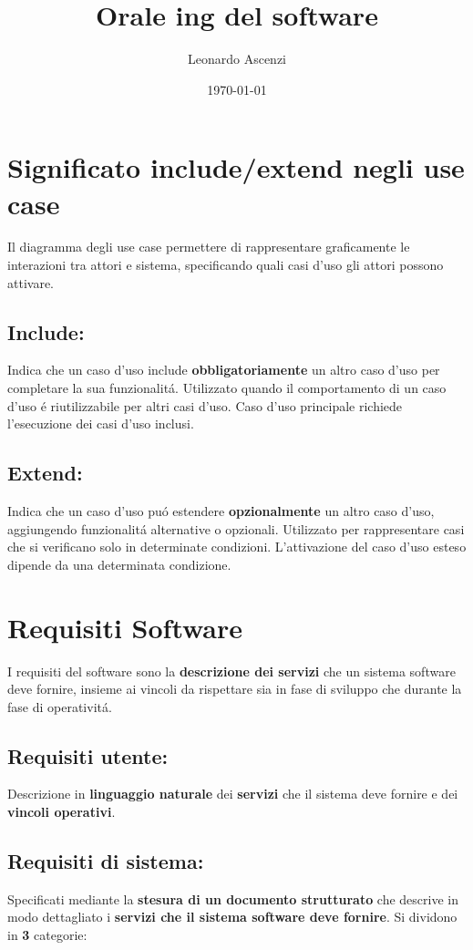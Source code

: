 \documentclass[11pt]{article}
\author{Leonardo Ascenzi}
\date{\today}
\title{Orale ing del software}
\begin{document}
\maketitle
\tableofcontents

\section{Significato include/extend negli use case}
\label{sec:orgfa5d0e7}
Il diagramma degli use case permettere di rappresentare graficamente le interazioni tra attori e sistema, specificando quali casi d'uso gli attori possono attivare.
\subsection{Include:}
\label{sec:org8bacc91}
Indica che un caso d'uso include \textbf{\textbf{obbligatoriamente}} un altro caso d'uso per completare la sua funzionalitá.
Utilizzato quando il comportamento di un caso d'uso é riutilizzabile per altri casi d'uso.
Caso d'uso principale richiede l'esecuzione dei casi d'uso inclusi.
\subsection{Extend:}
\label{sec:org7c61211}
Indica che un caso d'uso puó estendere \textbf{\textbf{opzionalmente}} un altro caso d'uso, aggiungendo funzionalitá alternative o opzionali.
Utilizzato per rappresentare casi che si verificano solo in determinate condizioni.
L'attivazione del caso d'uso esteso dipende da una determinata condizione.
\section{Requisiti Software}
\label{sec:org49ff2ee}
I requisiti del software sono la \textbf{\textbf{descrizione dei servizi}} che un sistema software deve fornire, insieme ai vincoli da rispettare sia in fase di sviluppo che durante la fase di operativitá.
\subsection{Requisiti utente:}
\label{sec:orgccdbd6a}
Descrizione in \textbf{\textbf{linguaggio naturale}} dei \textbf{\textbf{servizi}} che il sistema deve fornire e dei \textbf{\textbf{vincoli operativi}}.
\subsection{Requisiti di sistema:}
\label{sec:org8f34a74}
Specificati mediante la \textbf{\textbf{stesura di un documento strutturato}} che descrive in modo dettagliato i \textbf{\textbf{servizi che il sistema software deve fornire}}.
Si dividono in \textbf{\textbf{3}} categorie:
\end{document}
